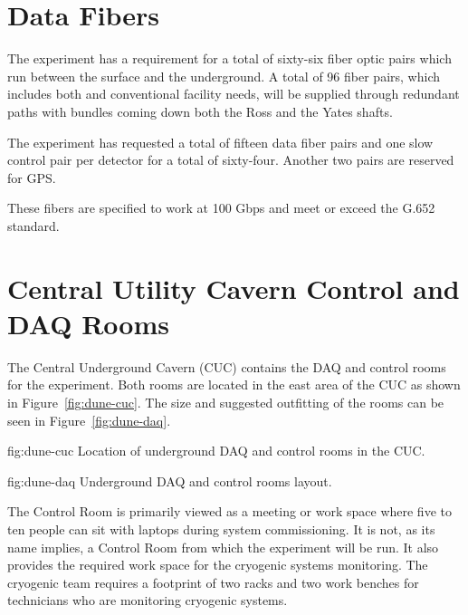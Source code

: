 \section{Data Fibers}
\label{sec:fdsp-coord-faci-fibers}

The  experiment has a requirement for a total of sixty-six fiber
optic pairs which run between the surface and the underground.  A
total of 96 fiber pairs, which includes both  and conventional
facility needs, will be supplied through redundant paths with bundles
coming down both the Ross and the Yates shafts.

The experiment has requested a total of fifteen data fiber pairs and
one slow control pair per detector for a total of sixty-four.  Another
two pairs are reserved for GPS.

These fibers are specified to work at 100 Gbps and meet or exceed the
G.652 standard.

\section{Central Utility Cavern Control and DAQ Rooms}
\label{sec:fdsp-coord-cuc-daq}

The Central Underground Cavern (CUC) contains the DAQ and control
rooms for the  experiment.  Both rooms are located in the east
area of the CUC as shown in Figure~\ref{fig:dune-cuc}.  The size and
suggested outfitting of the rooms can be seen in Figure~\ref{fig:dune-daq}.
\begin{dunefigure}{fig:dune-cuc}
  {Location of underground DAQ and control rooms in the CUC.}
\end{dunefigure}
\begin{dunefigure}{fig:dune-daq}
  {Underground DAQ and control rooms layout.}
\end{dunefigure}

The Control Room is primarily viewed as a meeting or work space where
five to ten people can sit with laptops during system commissioning.
It is not, as its name implies, a Control Room from which the
experiment will be run.  It also provides the required work space for
the cryogenic systems monitoring.  The cryogenic team requires a
footprint of two racks and two work benches for technicians who are
monitoring cryogenic systems.
       
